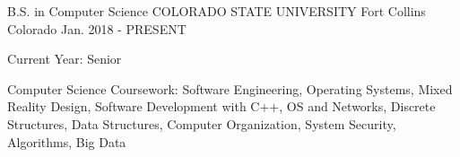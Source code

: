 

\begin{cventries}

  \cventry
    {B.S. in Computer Science} %
    {COLORADO STATE UNIVERSITY} %
    {Fort Collins Colorado} %
    {Jan. 2018 - PRESENT} %
    {
      \begin{cvitems} %
        \item {Current Year: Senior}
        \item {Computer Science Coursework:  Software Engineering, Operating Systems, Mixed Reality Design, Software Development with C++, OS and Networks, Discrete Structures, Data Structures, Computer Organization, System Security, Algorithms, Big Data}
      \end{cvitems}
    }

\end{cventries}
